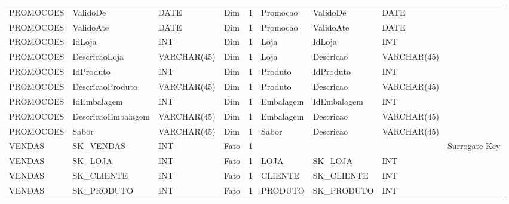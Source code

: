 \begin{landscape}
\begin{longtable}{l|l|l|l|l|l|l|l|l}
{\scriptsize{}PROMOCOES} & {\scriptsize{}ValidoDe} & {\scriptsize{}DATE} & {\scriptsize{}Dim} & {\scriptsize{}1} & {\scriptsize{}Promocao} & {\scriptsize{}ValidoDe} & {\scriptsize{}DATE} & \tabularnewline
{\scriptsize{}PROMOCOES} & {\scriptsize{}ValidoAte} & {\scriptsize{}DATE} & {\scriptsize{}Dim} & {\scriptsize{}1} & {\scriptsize{}Promocao} & {\scriptsize{}ValidoAte} & {\scriptsize{}DATE} & \tabularnewline
{\scriptsize{}PROMOCOES} & {\scriptsize{}IdLoja} & {\scriptsize{}INT} & {\scriptsize{}Dim} & {\scriptsize{}1} & {\scriptsize{}Loja} & {\scriptsize{}IdLoja} & {\scriptsize{}INT} & \tabularnewline
{\scriptsize{}PROMOCOES} & {\scriptsize{}DescricaoLoja} & {\scriptsize{}VARCHAR(45)} & {\scriptsize{}Dim} & {\scriptsize{}1} & {\scriptsize{}Loja} & {\scriptsize{}Descricao} & {\scriptsize{}VARCHAR(45)} & \tabularnewline
{\scriptsize{}PROMOCOES} & {\scriptsize{}IdProduto} & {\scriptsize{}INT} & {\scriptsize{}Dim} & {\scriptsize{}1} & {\scriptsize{}Produto} & {\scriptsize{}IdProduto} & {\scriptsize{}INT} & \tabularnewline
{\scriptsize{}PROMOCOES} & {\scriptsize{}DescricaoProduto} & {\scriptsize{}VARCHAR(45)} & {\scriptsize{}Dim} & {\scriptsize{}1} & {\scriptsize{}Produto} & {\scriptsize{}Descricao} & {\scriptsize{}VARCHAR(45)} & \tabularnewline
{\scriptsize{}PROMOCOES} & {\scriptsize{}IdEmbalagem} & {\scriptsize{}INT} & {\scriptsize{}Dim} & {\scriptsize{}1} & {\scriptsize{}Embalagem} & {\scriptsize{}IdEmbalagem} & {\scriptsize{}INT} & \tabularnewline
{\scriptsize{}PROMOCOES} & {\scriptsize{}DescricaoEmbalagem} & {\scriptsize{}VARCHAR(45)} & {\scriptsize{}Dim} & {\scriptsize{}1} & {\scriptsize{}Embalagem} & {\scriptsize{}Descricao} & {\scriptsize{}VARCHAR(45)} & \tabularnewline
{\scriptsize{}PROMOCOES} & {\scriptsize{}Sabor} & {\scriptsize{}VARCHAR(45)} & {\scriptsize{}Dim} & {\scriptsize{}1} & {\scriptsize{}Sabor} & {\scriptsize{}Descricao} & {\scriptsize{}VARCHAR(45)} & \tabularnewline
{\scriptsize{}VENDAS} & {\scriptsize{}SK\_VENDAS} & {\scriptsize{}INT} & {\scriptsize{}Fato} & {\scriptsize{}1} &  &  &  & {\scriptsize{}Surrogate Key}\tabularnewline
{\scriptsize{}VENDAS} & {\scriptsize{}SK\_LOJA} & {\scriptsize{}INT} & {\scriptsize{}Fato} & {\scriptsize{}1} & {\scriptsize{}LOJA} & {\scriptsize{}SK\_LOJA} & {\scriptsize{}INT} & \tabularnewline
{\scriptsize{}VENDAS} & {\scriptsize{}SK\_CLIENTE} & {\scriptsize{}INT} & {\scriptsize{}Fato} & {\scriptsize{}1} & {\scriptsize{}CLIENTE} & {\scriptsize{}SK\_CLIENTE} & {\scriptsize{}INT} & \tabularnewline
{\scriptsize{}VENDAS} & {\scriptsize{}SK\_PRODUTO} & {\scriptsize{}INT} & {\scriptsize{}Fato} & {\scriptsize{}1} & {\scriptsize{}PRODUTO} & {\scriptsize{}SK\_PRODUTO} & {\scriptsize{}INT} & \tabularnewline

\end{longtable}
\end{landscape}
